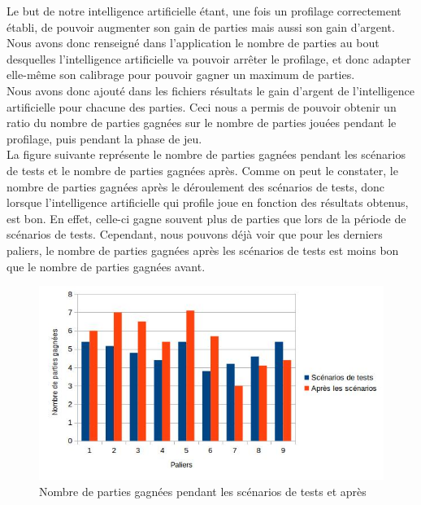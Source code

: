 \documentclass{report}
\begin{document}
Le but de notre intelligence artificielle étant, une fois un profilage correctement établi, de pouvoir augmenter son gain de parties mais aussi son gain d'argent. Nous avons donc renseigné dans l'application le nombre de parties au bout desquelles l'intelligence artificielle va pouvoir arrêter le profilage, et donc adapter elle-même son calibrage pour pouvoir gagner un maximum de parties.\\



Nous avons donc ajouté dans les fichiers résultats le gain d'argent de l'intelligence artificielle pour chacune des parties. Ceci nous a permis de pouvoir obtenir un ratio du nombre de parties gagnées sur le nombre de parties jouées pendant le profilage, puis pendant la phase de jeu.\\


La figure suivante représente le nombre de parties gagnées pendant les scénarios de tests et le nombre de parties gagnées après. Comme on peut le constater, le nombre de parties gagnées après le déroulement des scénarios de tests, donc lorsque l'intelligence artificielle qui profile joue en fonction des résultats obtenus, est bon. En effet, celle-ci gagne souvent plus de parties que lors de la période de scénarios de tests. Cependant, nous pouvons déjà voir que pour les derniers paliers, le nombre de parties gagnées après les scénarios de tests est moins bon que le nombre de parties gagnées avant.\par

\begin{figure}[H]
	\begin{center}
		\includegraphics[scale=0.5]{./imagesRapport/PremierCalibrageComparaisonNombrePartiesGagnees.jpg}
	\end{center}
	\caption{Nombre de parties gagnées pendant les scénarios de tests et après}
\end{figure}
\end{document}
